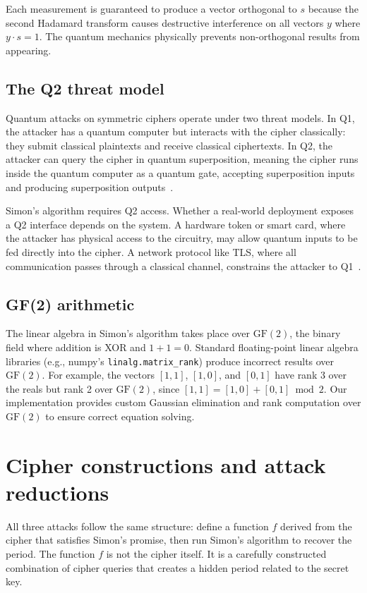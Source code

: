 \documentclass[11pt]{article}
\begin{document}
Each measurement is guaranteed to produce a vector orthogonal to $s$ because the second Hadamard transform causes destructive interference on all vectors $y$ where $y \cdot s = 1$. The quantum mechanics physically prevents non-orthogonal results from appearing.

\subsection{The Q2 threat model}

Quantum attacks on symmetric ciphers operate under two threat models. In Q1, the attacker has a quantum computer but interacts with the cipher classically: they submit classical plaintexts and receive classical ciphertexts. In Q2, the attacker can query the cipher in quantum superposition, meaning the cipher runs inside the quantum computer as a quantum gate, accepting superposition inputs and producing superposition outputs~\cite{boneh2013,gagliardoni2016}.

Simon's algorithm requires Q2 access. Whether a real-world deployment exposes a Q2 interface depends on the system. A hardware token or smart card, where the attacker has physical access to the circuitry, may allow quantum inputs to be fed directly into the cipher. A network protocol like TLS, where all communication passes through a classical channel, constrains the attacker to Q1~\cite{kaplan2016,bonnetain2022}.

\subsection{GF(2) arithmetic}

The linear algebra in Simon's algorithm takes place over $\text{GF}(2)$, the binary field where addition is XOR and $1 + 1 = 0$. Standard floating-point linear algebra libraries (e.g., numpy's \texttt{linalg.matrix\_rank}) produce incorrect results over $\text{GF}(2)$. For example, the vectors $[1,1]$, $[1,0]$, and $[0,1]$ have rank 3 over the reals but rank 2 over $\text{GF}(2)$, since $[1,1] = [1,0] + [0,1] \bmod 2$. Our implementation provides custom Gaussian elimination and rank computation over $\text{GF}(2)$ to ensure correct equation solving.

\section{Cipher constructions and attack reductions}

All three attacks follow the same structure: define a function $f$ derived from the cipher that satisfies Simon's promise, then run Simon's algorithm to recover the period. The function $f$ is not the cipher itself. It is a carefully constructed combination of cipher queries that creates a hidden period related to the secret key.
\end{document}
